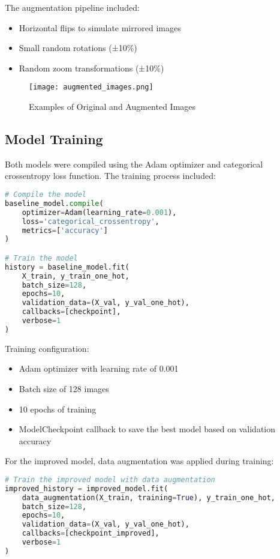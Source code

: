\documentclass[12pt]{article}
\begin{document}
The augmentation pipeline included:
\begin{itemize}
    \item Horizontal flips to simulate mirrored images
    \item Small random rotations (±10\%)
    \item Random zoom transformations (±10\%)
\end{itemize}

\begin{figure}[h]
    \centering
    \texttt{[image: augmented\_images.png]}
    \caption{Examples of Original and Augmented Images}
\end{figure}

\subsection{Model Training}
Both models were compiled using the Adam optimizer and categorical crossentropy loss function. The training process included:

\begin{lstlisting}[language=Python, caption=Model Training]
# Compile the model
baseline_model.compile(
    optimizer=Adam(learning_rate=0.001),
    loss='categorical_crossentropy',
    metrics=['accuracy']
)

# Train the model
history = baseline_model.fit(
    X_train, y_train_one_hot,
    batch_size=128,
    epochs=10,
    validation_data=(X_val, y_val_one_hot),
    callbacks=[checkpoint],
    verbose=1
)
\end{lstlisting}

Training configuration:
\begin{itemize}
    \item Adam optimizer with learning rate of 0.001
    \item Batch size of 128 images
    \item 10 epochs of training
    \item ModelCheckpoint callback to save the best model based on validation accuracy
\end{itemize}

For the improved model, data augmentation was applied during training:

\begin{lstlisting}[language=Python, caption=Training with Data Augmentation]
# Train the improved model with data augmentation
improved_history = improved_model.fit(
    data_augmentation(X_train, training=True), y_train_one_hot,
    batch_size=128,
    epochs=10,
    validation_data=(X_val, y_val_one_hot),
    callbacks=[checkpoint_improved],
    verbose=1
)
\end{lstlisting}
\end{document}

